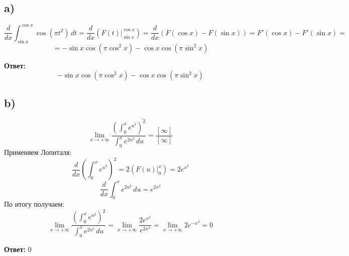 \documentclass[a4paper,12pt]{article}
\begin{document}
\subsection*{a)}
\[
\frac{d}{dx} \int_{\sin x}^{\cos x} \cos \left( \pi t^2\right) \, dt = \frac{d}{dx} \left(F(t) \bigg|_{\sin x}^{\cos x} \right) = \frac{d}{dx} \left(F(\cos x) - F (\sin x)\right) = F'(\cos x) - F'(\sin x)=
\]
\[
= - \sin x \cos (\pi \cos^2 x) - \cos x \cos (\pi \sin^2 x)
\]
{\Large \begin{center}
\textbf{Ответ: } 
\[
- \sin x \cos (\pi \cos^2 x) - \cos x \cos (\pi \sin^2 x)
\]
\end{center}}
\subsection*{b)}
\[
\lim_{x \rightarrow +\infty} \frac{\left(\int_0^x e^{u^2}\right)^2}{\int_0^x e^{2u^2} \, du} = \frac{[\infty]}{[\infty]}
\]
Применяем Лопиталя:
\[
\frac{d}{dx} \left(\int_0^x e^{u^2}\right)^2 = 2 \left(F(u) \bigg|_0^x \right) = 2e^{x^2}
\]
\[
\frac{d}{dx} \int_0^x e^{2u^2} \, du = e^{2x^2}
\]
По итогу получаем:
\[
\lim_{x \rightarrow +\infty} \frac{\left(\int_0^x e^{u^2}\right)^2}{\int_0^x e^{2u^2} \, du} = \lim_{x \rightarrow +\infty} \frac{2e^{x^2}}{e^{2x^2}} = \lim_{x \rightarrow +\infty} 2 e^{-x^2} = 0
\] 
{\Large \begin{center}
\textbf{Ответ: }  0
\end{center}}
\end{document}
